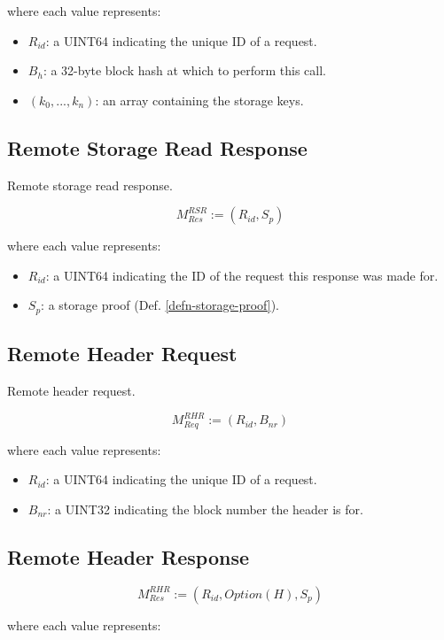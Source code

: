 \documentclass{book}
\begin{document}
where each value represents:

\begin{itemize}
    \item $R_{id}$: a UINT64 indicating the unique ID of a request.
    \item $B_h$: a 32-byte block hash at which to perform this call.
    \item $(k_0, ..., k_n)$: an array containing the storage keys.
\end{itemize}

\subsection{Remote Storage Read Response}

Remote storage read response.

\[
    M^{RSR}_{Res} := (R_{id}, S_p)
\]

where each value represents:

\begin{itemize}
    \item $R_{id}$: a UINT64 indicating the ID of the request this response was
    made for.
    \item $S_p$: a storage proof (Def. \ref{defn-storage-proof}).
\end{itemize}

\subsection{Remote Header Request}

Remote header request.

\[
    M^{RHR}_{Req} := (R_{id}, B_{nr})
\]

where each value represents:

\begin{itemize}
    \item $R_{id}$: a UINT64 indicating the unique ID of a request.
    \item $B_{nr}$: a UINT32 indicating the block number the header is for.
\end{itemize}

\subsection{Remote Header Response}

\[
    M^{RHR}_{Res} := (R_{id}, Option(H), S_p)
\]

where each value represents:
\end{document}
